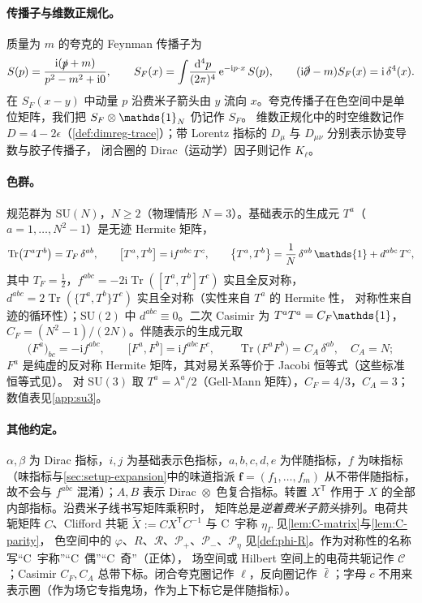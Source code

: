 \documentclass[UTF8,a4paper,11pt,fontset=fandol]{ctexart}
\let\amsmathbb\mathbb
\renewcommand{\mathbb}[1]{\ifx1#1\mathds{1}\else\amsmathbb{#1}\fi}
\theoremstyle{cplain}
\theoremstyle{cdefinition}
\theoremstyle{cremark}
\numberwithin{equation}{section}
\DeclareMathOperator{\Tr}{Tr}
\newcommand{\sla}[1]{\slashed{#1}}                  %
\newcommand{\dd}{\mathrm{d}}                         %
\newcommand{\tp}{\mathsf{T}}                         %
\newcommand{\Cop}{\mathcal{C}}                       %
\newcommand{\Rop}{\mathcal{R}}                       %
\newcommand{\Pp}{\mathcal{P}_{+}}                    %
\newcommand{\Pm}{\mathcal{P}_{-}}                    %
\newcommand{\SF}{S_{F}}                              %
\newcommand{\ii}{\mathrm{i}}                        %
\newcommand{\ee}{\mathrm{e}}                        %
\newcommand{\Cconj}[1]{\widetilde{#1}}              %
\begin{document}
\paragraph{传播子与维数正规化。}
质量为 $m$ 的夸克的 Feynman 传播子为
\begin{equation}\label{eq:setup-propagator}
S(p)=\frac{\ii(\sla p+m)}{p^2-m^2+\ii0},\qquad
\SF(x)=\int\!\frac{\dd^4p}{(2\pi)^4}\,\ee^{-\ii p\cdot x}\,S(p),\qquad (\ii\sla\partial-m)\SF(x)=\ii\,\delta^4(x).
\end{equation}
在 $\SF(x-y)$ 中动量 $p$ 沿费米子箭头由 $y$ 流向 $x$。夸克传播子在色空间中是单位矩阵，我们把 $\SF\otimes\mathbb 1_N$ 仍记作 $\SF$。
维数正规化中的时空维数记作 $D=4-2\epsilon$（\cref{def:dimreg-trace}）；带 Lorentz 指标的 $D_\mu$ 与 $D_{\mu\nu}$ 分别表示协变导数与胶子传播子，
闭合圈的 Dirac（运动学）因子则记作 $K_\ell$。

\paragraph{色群。}
规范群为 $\mathrm{SU}(N)$，$N\ge2$（物理情形 $N=3$）。基础表示的生成元 $T^a$（$a=1,\dots,N^2-1$）是无迹 Hermite 矩阵，
\begin{equation}\label{eq:setup-generators}
\Tr\bigl(T^aT^b\bigr)=T_F\,\delta^{ab},\qquad
\bigl[T^a,T^b\bigr]=\ii f^{abc}\,T^c,\qquad
\bigl\{T^a,T^b\bigr\}=\frac1N\,\delta^{ab}\,\mathbb 1+d^{abc}\,T^c ,
\end{equation}
其中 $T_F=\frac12$，$f^{abc}=-2\ii\Tr([T^a,T^b]T^c)$ 实且全反对称，$d^{abc}=2\Tr(\{T^a,T^b\}T^c)$ 实且全对称（实性来自 $T^a$ 的 Hermite 性，
对称性来自迹的循环性）；$\mathrm{SU}(2)$ 中 $d^{abc}\equiv0$。二次 Casimir 为 $T^aT^a=C_F\mathbb 1$，$C_F=(N^2-1)/(2N)$。伴随表示的生成元取
\begin{equation}\label{eq:setup-adjoint}
\bigl(F^a\bigr)_{bc}=-\ii f^{abc},\qquad \bigl[F^a,F^b\bigr]=\ii f^{abc}F^c,\qquad \Tr\bigl(F^aF^b\bigr)=C_A\,\delta^{ab},\quad C_A=N ;
\end{equation}
$F^a$ 是纯虚的反对称 Hermite 矩阵，其对易关系等价于 Jacobi 恒等式（这些标准恒等式见\cite{Haber2021}）。
对 $\mathrm{SU}(3)$ 取 $T^a=\lambda^a/2$（Gell-Mann 矩阵\cite{GellMann1962}），$C_F=4/3$，$C_A=3$；数值表见\cref{app:su3}。

\paragraph{其他约定。}
$\alpha,\beta$ 为 Dirac 指标，$i,j$ 为基础表示色指标，$a,b,c,d,e$ 为伴随指标，$f$ 为味指标（味指标与\cref{sec:setup-expansion}中的味道指派 $\boldsymbol f=(f_1,\dots,f_m)$ 从不带伴随指标，
故不会与 $f^{abc}$ 混淆）；$A,B$ 表示 Dirac~$\otimes$~色复合指标。转置 $X^{\tp}$ 作用于 $X$ 的全部内部指标。沿费米子线书写矩阵乘积时，
矩阵总是\emph{逆着费米子箭头}排列。电荷共轭矩阵 $C$、Clifford 共轭 $\Cconj X:=CX^{\tp}C^{-1}$ 与 C~宇称 $\eta_\Gamma$ 见\cref{lem:C-matrix}与\cref{lem:C-parity}，
色空间中的 $\varphi$、$R$、$\Rop$、$\Pp$、$\Pm$、$\mathcal P_\eta$ 见\cref{def:phi-R}。作为对称性的名称写“C~宇称”“C~偶”“C~奇”（正体），
场空间或 Hilbert 空间上的电荷共轭记作 $\Cop$；Casimir $C_F,C_A$ 总带下标。闭合夸克圈记作 $\ell$，反向圈记作 $\bar\ell$；字母 $c$ 不用来表示圈（作为场它专指鬼场，作为上下标它是伴随指标）。
\end{document}
